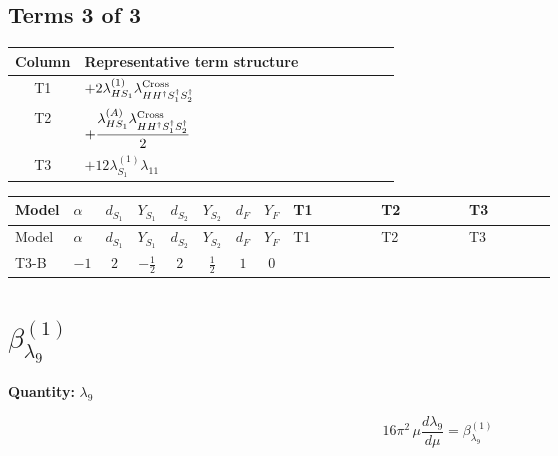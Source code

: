 \documentclass[8pt]{article}
\begin{document}
\begin{landscape}
\subsection*{Terms 3 of 3}
\begin{center}
\begin{tabular}{@{}c >{\raggedright\arraybackslash}p{0.82\linewidth}@{}}
\toprule
Column & Representative term structure \\
\midrule
T1 & \(\displaystyle +2 {\lambda_{HS_1}^{(1)}} {\lambda_{H H^\dagger S_1^\dagger S_2^\dagger}^{\rm Cross}}\) \\
\midrule
T2 & \(\displaystyle +\frac{{\lambda_{HS_1}^{(A)}} {\lambda_{H H^\dagger S_1^\dagger S_2^\dagger}^{\rm Cross}}}{2}\) \\
\midrule
T3 & \(\displaystyle +12 {\lambda_{S_1}^{(1)}} {\lambda_{11}}\) \\
\midrule
\bottomrule
\end{tabular}
\end{center}
\smallskip
\tiny
\begin{longtable}{@{}llcccccc >{\raggedright\arraybackslash}p{0.21\linewidth} >{\raggedright\arraybackslash}p{0.21\linewidth} >{\raggedright\arraybackslash}p{0.21\linewidth}@{}}
\toprule
Model & $\alpha$ & $d_{S_1}$ & $Y_{S_1}$ & $d_{S_2}$ & $Y_{S_2}$ & $d_F$ & $Y_F$ & T1 & T2 & T3 \\
\midrule
\endfirsthead
\toprule
Model & $\alpha$ & $d_{S_1}$ & $Y_{S_1}$ & $d_{S_2}$ & $Y_{S_2}$ & $d_F$ & $Y_F$ & T1 & T2 & T3 \\
\midrule
\endhead
T3-B & $-1$ & $2$ & $-\frac{1}{2}$ & $2$ & $\frac{1}{2}$ & $1$ & $0$ & \scriptsize\adjustbox{max width=\linewidth}{$\begin{gathered} +2 {\lambda_{HS_1}^{(1)}} {\lambda_{H H^\dagger S_1^\dagger S_2^\dagger}^{\rm Cross}}\end{gathered}$} & \scriptsize\adjustbox{max width=\linewidth}{$\begin{gathered} +\frac{{\lambda_{HS_1}^{(A)}} {\lambda_{H H^\dagger S_1^\dagger S_2^\dagger}^{\rm Cross}}}{2}\end{gathered}$} & \scriptsize\adjustbox{max width=\linewidth}{$\begin{gathered} +12 {\lambda_{S_1}^{(1)}} {\lambda_{11}}\end{gathered}$} \\
\midrule
\bottomrule
\end{longtable}
\clearpage
\section*{$\beta_{\lambda_{9}}^{(1)}$}
\noindent\textbf{Quantity: }$\lambda_{9}$\par\smallskip
\[16\pi^2\,\mu\frac{d \lambda_{9}}{d\mu}=\beta_{\lambda_{9}}^{(1)}\]

\end{landscape}
\end{document}
